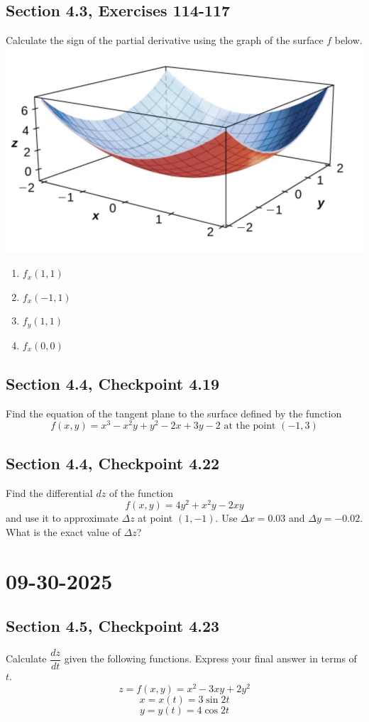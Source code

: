 \documentclass[]{mangos-musings}
\begin{document}
\subsection{Section 4.3, Exercises 114-117}
Calculate the sign of the partial derivative using the graph of the surface $f$ below.
\\\includegraphics[scale=0.4]{assets/rec10-ex114-117.png}
\begin{enumerate}[start=114]
  \item $f_x(1, 1)$
  \item $f_x(-1, 1)$
  \item $f_y(1, 1)$
  \item $f_x(0, 0)$
\end{enumerate}
\subsection{Section 4.4, Checkpoint 4.19}
Find the equation of the tangent plane to the surface defined by the function 
\[f(x, y) = x^3 - x^2 y + y^2 - 2x + 3y - 2 \text{ at the point }(-1, 3)\]

\newpage
\subsection{Section 4.4, Checkpoint 4.22}
Find the differential $dz$ of the function 
\[f(x, y) = 4y^2 + x^2 y - 2xy\]
and use it to approximate $\Delta z$ at point $(1, -1)$. Use $\Delta x = 0.03$ and $\Delta y = -0.02$.
What is the exact value of $\Delta z$?


\newpage
\section{09-30-2025}
\subsection{Section 4.5, Checkpoint 4.23}
Calculate $\dfrac{dz}{dt}$ given the following functions. Express your final answer in terms of $t$.
\[z = f(x, y) = x^2 - 3xy + 2y^2\]
\[x = x(t) = 3\sin 2t\]
\[y = y(t) = 4\cos 2t\]
\begin{align*}
  \\ \\ \\ \\
\end{align*}
\end{document}
